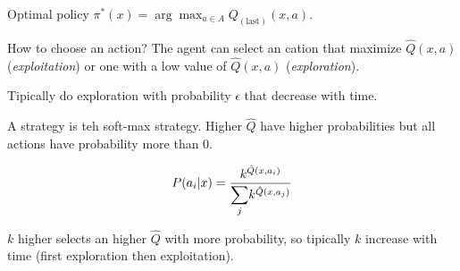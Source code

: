Optimal policy $\pi^*(x) = \arg\max_{a \in A} Q_{(\text{last})}(x,a)$.

How to choose an action?
The agent can select an cation that maximize $\hat{Q}(x, a)$ ({\em exploitation}) or one with a low value of $\hat{Q}(x, a)$ ({\em exploration}).

Tipically do exploration with probability $\epsilon$ that decrease with time.

A strategy is teh soft-max strategy. Higher $\hat{Q}$ have higher probabilities but all actions have probability more than 0.

\[
P(a_i|x) = \frac{k^{\hat{Q}(x, a_i)}}{\mathlarger{\sum}_j k^{\hat{Q}(x, a_j)}}
\]

$k$ higher selects an higher $\hat{Q}$ with more probability, so tipically $k$ increase with time (first exploration then exploitation).



